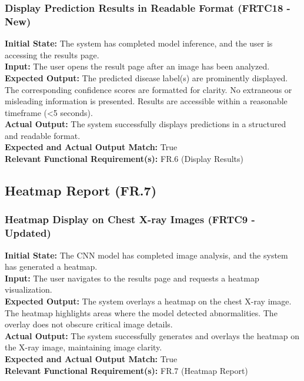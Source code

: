 \documentclass[12pt, titlepage]{article}
\begin{document}
\subsubsection{Display Prediction Results in Readable Format (FRTC18 - New)}
\textbf{Initial State:} The system has completed model inference, and the user is accessing the results page.\\
\textbf{Input:} The user opens the result page after an image has been analyzed.\\
\textbf{Expected Output:} The predicted disease label(s) are prominently displayed. The corresponding confidence scores are formatted for clarity. No extraneous or misleading information is presented. Results are accessible within a reasonable timeframe (<5 seconds).\\
\textbf{Actual Output:} The system successfully displays predictions in a structured and readable format.\\
\textbf{Expected and Actual Output Match:} True\\
\textbf{Relevant Functional Requirement(s):} FR.6 (Display Results)\\

\subsection{Heatmap Report (FR.7)}
\subsubsection{Heatmap Display on Chest X-ray Images (FRTC9 - Updated)}
\textbf{Initial State:} The CNN model has completed image analysis, and the system has generated a heatmap.\\
\textbf{Input:} The user navigates to the results page and requests a heatmap visualization.\\
\textbf{Expected Output:} The system overlays a heatmap on the chest X-ray image. The heatmap highlights areas where the model detected abnormalities. The overlay does not obscure critical image details.\\
\textbf{Actual Output:} The system successfully generates and overlays the heatmap on the X-ray image, maintaining image clarity.\\
\textbf{Expected and Actual Output Match:} True\\
\textbf{Relevant Functional Requirement(s):} FR.7 (Heatmap Report)\\
\end{document}

